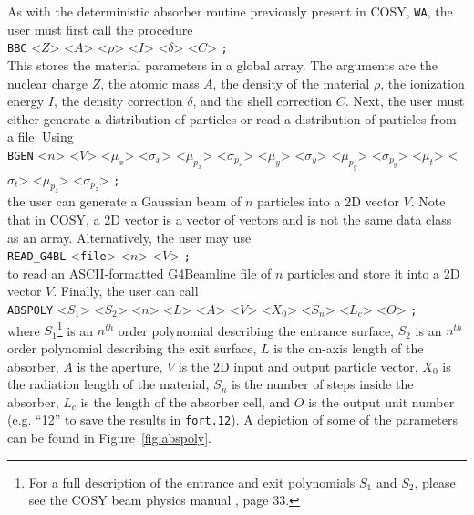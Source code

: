 \label{ssc:user_input}

As with the deterministic absorber routine previously present in COSY, \texttt{WA}, the user must first call the procedure\\
\texttt{BBC} <$Z$> <$A$> <$\rho$> <$I$> <$\delta$> <$C$> \texttt{;} \\
This stores the material parameters in a global array. The arguments are the nuclear charge $Z$, the atomic mass $A$, the density of the material $\rho$, the ionization energy $I$, the density correction $\delta$, and the shell correction $C$. Next, the user must either generate a distribution of particles or read a distribution of particles from a file. Using \\
\texttt{BGEN} <$n$> <$V$> <$\mu_x$> <$\sigma_x$> <$\mu_{p_x}$> <$\sigma_{p_x}$> <$\mu_y$> <$\sigma_y$> <$\mu_{p_y}$> <$\sigma_{p_y}$> <$\mu_t$> <$\sigma_t$> <$\mu_{p_z}$> <$\sigma_{p_z}$> \texttt{;}\\
the user can generate a Gaussian beam of $n$ particles into a 2D vector $V$. Note that in COSY, a 2D vector is a vector of vectors and is not the same data class as an array. Alternatively, the user may use \\
\verb|READ_G4BL| <\texttt{file}> <$n$> <$V$> \texttt{;}\\
to read an ASCII-formatted G4Beamline file of $n$ particles and store it into a 2D vector $V$. Finally, the user can call\\
\texttt{ABSPOLY} <$S_1$> <$S_2$> <$n$> <$L$> <$A$> <$V$> <$X_0$> <$S_n$> <$L_c$> <$O$> \texttt{;}\\
where $S_1$\footnote{For a full description of the entrance and exit polynomials $S_1$ and $S_2$, please see the COSY beam physics manual \cite{cosy}, page 33.} is an $n^{th}$ order polynomial describing the entrance surface, $S_2$ is an $n^{th}$ order polynomial describing the exit surface, $L$ is the on-axis length of the absorber, $A$ is the aperture, $V$ is the 2D input and output particle vector, $X_0$ is the radiation length of the material, $S_n$ is the number of steps inside the absorber, $L_c$ is the length of the absorber cell, and $O$ is the output unit number (e.g. ``12'' to save the results in \texttt{fort.12}). A depiction of some of the parameters can be found in Figure~\ref{fig:abspoly}.

